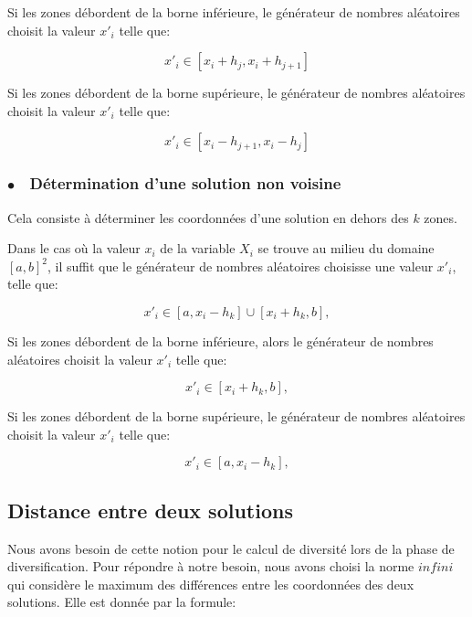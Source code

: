 Si les zones débordent de la borne inférieure, le générateur de nombres aléatoires choisit la valeur $x'_i$ telle que:

$$
x'_i\in[x_i+h_j,x_i+h_{j+1}]
$$

Si les zones débordent de la borne supérieure, le générateur de nombres aléatoires choisit la valeur $x'_i$ telle que:

$$
x'_i\in[x_i-h_{j+1},x_i-h_j]
$$

\subsubsection{$\bullet\quad$Détermination d'une solution non voisine}

Cela consiste à déterminer les coordonnées d'une solution en dehors des $k$ zones.

Dans le cas où la valeur $x_i$ de la variable $X_i$ se trouve au milieu du domaine $[a,b]^2$, il suffit que le générateur de nombres aléatoires choisisse une valeur $x'_i$, telle que:

\begin{equation}
x'_i\in[a,x_i-h_k] \cup [x_i+h_k,b],\label{for1}
\end{equation}

Si les zones débordent de la borne inférieure, alors le générateur de nombres aléatoires choisit la valeur $x'_i$ telle que:

\begin{equation}
x'_i\in[x_i+h_k,b],\label{for2}
\end{equation}

Si les zones débordent de la borne supérieure, le générateur de nombres aléatoires choisit la valeur $x'_i$ telle que:

\begin{equation}
x'_i\in[a,x_i-h_k],\label{for3}
\end{equation}


\parbox[t][]{\textwidth}{}

\vspace{-2.5em}

\subsection{Distance entre deux solutions}
\begin{spacing}{1.6}
Nous avons besoin de cette notion pour le calcul de diversité lors de la phase de diversification. Pour répondre à notre besoin, nous avons choisi la norme $infini$ qui considère le maximum des différences entre les coordonnées des deux solutions. Elle est donnée par la formule:
\end{spacing}

